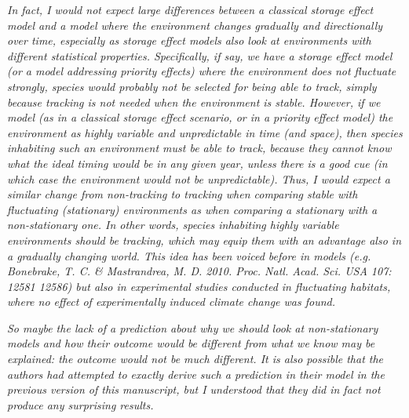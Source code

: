 \documentclass[11pt,letterpaper]{article}
\begin{document}
\emph{In fact, I would not expect large differences between a classical storage effect model and a
model where the environment changes gradually and directionally over time, especially as
storage effect models also look at environments with different statistical properties.
Specifically, if say, we have a storage effect model (or a model addressing priority effects)
where the environment does not fluctuate strongly, species would probably not be selected for
being able to track, simply because tracking is not needed when the environment is stable.
However, if we model (as in a classical storage effect scenario, or in a priority effect
model) the environment as highly variable and unpredictable in time (and space), then species
inhabiting such an environment must be able to track, because they cannot know what the ideal
timing would be in any given year, unless there is a good cue (in which case the environment
would not be unpredictable). Thus, I would expect a similar change from non-tracking to
tracking when comparing stable with fluctuating (stationary) environments as when comparing a
stationary with a non-stationary one. In other words, species inhabiting highly variable
environments should be tracking, which may equip them with an advantage also in a gradually
changing world. This idea has been voiced before in models (e.g. Bonebrake, T. C. \&
Mastrandrea, M. D. 2010. Proc. Natl. Acad. Sci. USA 107: 12581 12586) but also in
experimental studies conducted in fluctuating habitats, where no effect of experimentally
induced climate change was found.}

\emph{So maybe the lack of a prediction about why we should look at non-stationary models and how
their outcome would be different from what we know may be explained: the outcome would not be
much different. It is also possible that the authors had attempted to exactly derive such a
prediction in their model in the previous version of this manuscript, but I understood that
they did in fact not produce any surprising results.}\\
\end{document}
